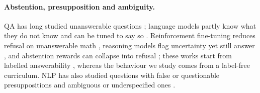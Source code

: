 \paragraph{Abstention, presupposition and ambiguity.} QA has long studied unanswerable questions \citep{rajpurkar2018squad2,kamath2020selective}; language models partly know what they do not know \citep{kadavath2022know,yin2023selfaware} and can be tuned to say so \citep{zhang2024rtuning,wen2025abstention}. Reinforcement fine-tuning reduces refusal on unanswerable math \citep{song2025hallucination}, reasoning models flag uncertainty yet still answer \citep{kirichenko2025abstentionbench,gu2026detection}, and abstention rewards can collapse into refusal \citep{che2026abstention}; these works start from labelled answerability \citep{tong2026aca}, whereas the behaviour we study comes from a label-free curriculum. NLP has also studied questions with false or questionable presuppositions \citep{karttunen1974presupposition,kim2021linguist,kim2023qa2,yu2023crepe,hu2023falsepremise} and ambiguous or underspecified ones \citep{min2020ambigqa,liu2023ambient,cole2023selectively,hou2024decomposing,li2025questbench}.
